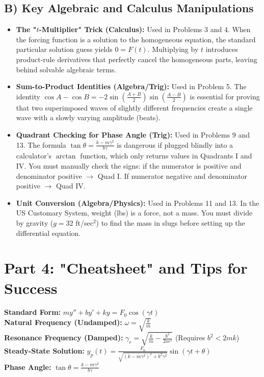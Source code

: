 \documentclass[11pt]{article}
\begin{document}
\subsection{B) Key Algebraic and Calculus Manipulations}
\begin{itemize}
    \item \textbf{The "$t$-Multiplier" Trick (Calculus):} Used in Problems 3 and 4. When the forcing function is a solution to the homogeneous equation, the standard particular solution guess yields $0 = F(t)$. Multiplying by $t$ introduces product-rule derivatives that perfectly cancel the homogeneous parts, leaving behind solvable algebraic terms.
    \item \textbf{Sum-to-Product Identities (Algebra/Trig):} Used in Problem 5. The identity $\cos A - \cos B = -2 \sin(\frac{A+B}{2}) \sin(\frac{A-B}{2})$ is essential for proving that two superimposed waves of slightly different frequencies create a single wave with a slowly varying amplitude (beats).
    \item \textbf{Quadrant Checking for Phase Angle (Trig):} Used in Problems 9 and 13. The formula $\tan \theta = \frac{k-m\gamma^2}{b\gamma}$ is dangerous if plugged blindly into a calculator's $\arctan$ function, which only returns values in Quadrants I and IV. You must manually check the signs: if the numerator is positive and denominator positive $\to$ Quad I. If numerator negative and denominator positive $\to$ Quad IV.
    \item \textbf{Unit Conversion (Algebra/Physics):} Used in Problems 11 and 13. In the US Customary System, weight (lbs) is a force, not a mass. You must divide by gravity ($g = 32$ ft/sec$^2$) to find the mass in slugs before setting up the differential equation.
\end{itemize}

\newpage
\section{Part 4: "Cheatsheet" and Tips for Success}

\begin{tcolorbox}[colback=blue!5,colframe=blue!40!black,title=Essential Formulas]
\textbf{Standard Form:} $m y'' + b y' + k y = F_0 \cos(\gamma t)$ \\
\textbf{Natural Frequency (Undamped):} $\omega = \sqrt{\frac{k}{m}}$ \\
\textbf{Resonance Frequency (Damped):} $\gamma_r = \sqrt{\frac{k}{m} - \frac{b^2}{2m^2}}$ \quad (Requires $b^2 < 2mk$) \\
\textbf{Steady-State Solution:} $y_p(t) = \frac{F_0}{\sqrt{(k-m\gamma^2)^2 + b^2\gamma^2}} \sin(\gamma t + \theta)$ \\
\textbf{Phase Angle:} $\tan \theta = \frac{k-m\gamma^2}{b\gamma}$
\end{tcolorbox}
\end{document}
